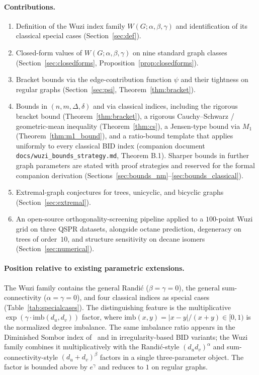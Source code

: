 \documentclass[11pt,a4paper]{article}
\theoremstyle{definition}
\newcommand{\Wuzi}{W(G;\alpha,\beta,\gamma)}
\begin{document}
\paragraph{Contributions.}
\begin{enumerate}[label=(\arabic*)]
\item Definition of the Wuzi index family
$\Wuzi$ and identification of its classical special cases
(Section~\ref{sec:def}).
\item Closed-form values of $\Wuzi$ on nine standard graph classes
(Section~\ref{sec:closedforms}, Proposition~\ref{prop:closedforms}).
\item Bracket bounds via the edge-contribution function $\psi$ and
their tightness on regular graphs
(Section~\ref{sec:psi}, Theorem~\ref{thm:bracket}).
\item Bounds in $(n,m,\Delta,\delta)$ and via classical indices,
including the rigorous bracket bound (Theorem~\ref{thm:bracket}),
a rigorous Cauchy--Schwarz / geometric-mean inequality
(Theorem~\ref{thm:cs}), a Jensen-type bound via $M_1$
(Theorem~\ref{thm:m1_bound}), and a ratio-bound template that
applies uniformly to every classical BID index (companion
document \texttt{docs/wuzi\_bounds\_strategy.md}, Theorem B.1).
Sharper bounds in further graph parameters are stated with proof
strategies and reserved for the formal companion derivation
(Sections~\ref{sec:bounds_nm}--\ref{sec:bounds_classical}).
\item Extremal-graph conjectures for trees, unicyclic, and bicyclic
graphs (Section~\ref{sec:extremal}).
\item An open-source orthogonality-screening pipeline applied to a
$100$-point Wuzi grid on three QSPR datasets, alongside octane
prediction, degeneracy on trees of order~$10$, and structure
sensitivity on decane isomers (Section~\ref{sec:numerical}).
\end{enumerate}

\paragraph{Position relative to existing parametric extensions.}
The Wuzi family contains the general Randi\'c
($\beta=\gamma=0$), the general sum-connectivity
($\alpha=\gamma=0$), and four classical indices as special cases
(Table~\ref{tab:specialcases}). The distinguishing feature is the
multiplicative $\exp(\gamma\cdot \mathrm{imb}(d_u,d_v))$ factor,
where $\mathrm{imb}(x,y)=|x-y|/(x+y)\in[0,1)$ is the normalized
degree imbalance. The same imbalance ratio appears in the
Diminished Sombor index of~\cite{MovahediGutmanRedzepovicFurtula2026}
and in irregularity-based BID variants; the Wuzi family combines
it multiplicatively with the Randi\'c-style $(d_u d_v)^\alpha$ and
sum-connectivity-style $(d_u+d_v)^\beta$ factors in a single
three-parameter object. The factor is bounded above by $e^{\gamma}$
and reduces to $1$ on regular graphs.
\end{document}
